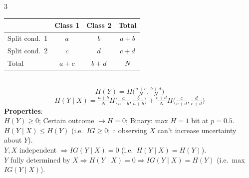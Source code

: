 \documentclass[10pt]{article}
\begin{document}
\begin{multicols*}{3}
{\begin{tabular}{@{}l|cc|c@{}}
 & Class 1 & Class 2 & Total\\\hline
Split cond.\ 1 & $a$ & $b$ & $a+b$\\
Split cond.\ 2 & $c$ & $d$ & $c+d$\\\hline
Total & $a+c$ & $b+d$ & $N$
\end{tabular}}\\
\[ H(Y)=H\big(\tfrac{a+c}{N},\tfrac{b+d}{N}\big) \]
\[ H(Y\mid X)=\tfrac{a+b}{N}H\big(\tfrac{a}{a+b},\tfrac{b}{a+b}\big)+\tfrac{c+d}{N}H\big(\tfrac{c}{c+d},\tfrac{d}{c+d}\big) \]
\textbf{Properties}:\\
$H(Y)\ge0$; Certain outcome $\to H=0$; Binary: max $H=1$ bit at $p=0.5$.\\
$H(Y\mid X) \le H(Y)$ (i.e.\ $IG\ge0$; $\because$ observing $X$ can't increase uncertainty about $Y$).\\
$Y, X$ independent $\Rightarrow IG(Y\mid X) = 0$ (i.e.\ $H(Y\mid X)=H(Y)$).\\
$Y$ fully determined by $X\Rightarrow H(Y\mid X)=0\Rightarrow IG(Y\mid X)=H(Y)$ (i.e.\ max $IG(Y\mid X)$).\\


\end{multicols*}
\end{document}
